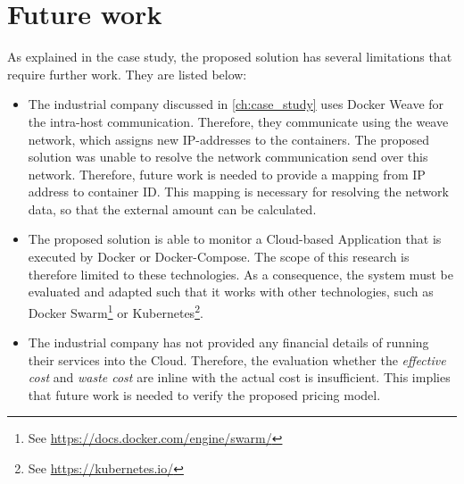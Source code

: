 \section{Future work} \label{sec:future_work}
As explained in the case study, the proposed solution has several limitations that require further work. They are listed below:

\begin{itemize}
    \item The industrial company discussed in \autoref{ch:case_study} uses Docker Weave for the intra-host communication. Therefore, they communicate using the weave network, which assigns new IP-addresses to the containers. The proposed solution was unable to resolve the network communication send over this network. Therefore, future work is needed to provide a mapping from IP address to container ID. This mapping is necessary for resolving the network data, so that the external amount can be calculated.
    \item The proposed solution is able to monitor a Cloud-based Application that is executed by Docker or Docker-Compose. The scope of this research is therefore limited to these technologies. As a consequence, the system must be evaluated and adapted such that it works with other technologies, such as Docker Swarm\footnote{See \url{https://docs.docker.com/engine/swarm/}} or Kubernetes\footnote{See \url{https://kubernetes.io/}}.
    \item The industrial company has not provided any financial details of running their services into the Cloud. Therefore, the evaluation whether the \textit{effective cost} and \textit{waste cost} are inline with the actual cost is insufficient. This implies that future work is needed to verify the proposed pricing model.
\end{itemize}